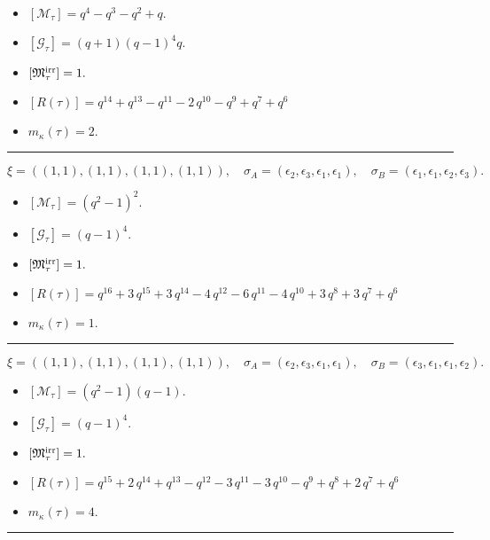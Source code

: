 \documentclass[10pt,a4paper]{amsart}
\begin{document}
\begin{itemize}
 \item $[\mathcal{M}_{\tau}] = q^{4} - q^{3} - q^{2} + q .$

 \item $[\mathcal{G}_{\tau}] = {\left(q + 1\right)} {\left(q - 1\right)}^{4} q .$

 \item $[{\frak M}_{\tau}^{\textrm{irr}}] = 1 .$

 \item $[R(\tau)] = q^{14} + q^{13} - q^{11} - 2 \, q^{10} - q^{9} + q^{7} + q^{6} $

 \item $m_{\kappa}(\tau) = 2 .$

 \end{itemize}
\noindent\rule{8cm}{0.4pt}

$$\xi = ({(1, 1), (1, 1)}, {(1, 1), (1, 1)}),\quad \sigma_A = ({{\epsilon_2}, {\epsilon_3}}, {{\epsilon_1}, {\epsilon_1}}),\quad \sigma_B = ({{\epsilon_1}, {\epsilon_1}}, {{\epsilon_2}, {\epsilon_3}}).$$

\begin{itemize}
 \item $[\mathcal{M}_{\tau}] = {\left(q^{2} - 1\right)}^{2} .$

 \item $[\mathcal{G}_{\tau}] = {\left(q - 1\right)}^{4} .$

 \item $[{\frak M}_{\tau}^{\textrm{irr}}] = 1 .$

 \item $[R(\tau)] = q^{16} + 3 \, q^{15} + 3 \, q^{14} - 4 \, q^{12} - 6 \, q^{11} - 4 \, q^{10} + 3 \, q^{8} + 3 \, q^{7} + q^{6} $

 \item $m_{\kappa}(\tau) = 1 .$

 \end{itemize}
\noindent\rule{8cm}{0.4pt}

$$\xi = ({(1, 1), (1, 1)}, {(1, 1), (1, 1)}),\quad \sigma_A = ({{\epsilon_2}, {\epsilon_3}}, {{\epsilon_1}, {\epsilon_1}}),\quad \sigma_B = ({{\epsilon_3}, {\epsilon_1}}, {{\epsilon_1}, {\epsilon_2}}).$$

\begin{itemize}
 \item $[\mathcal{M}_{\tau}] = {\left(q^{2} - 1\right)} {\left(q - 1\right)} .$

 \item $[\mathcal{G}_{\tau}] = {\left(q - 1\right)}^{4} .$

 \item $[{\frak M}_{\tau}^{\textrm{irr}}] = 1 .$

 \item $[R(\tau)] = q^{15} + 2 \, q^{14} + q^{13} - q^{12} - 3 \, q^{11} - 3 \, q^{10} - q^{9} + q^{8} + 2 \, q^{7} + q^{6} $

 \item $m_{\kappa}(\tau) = 4 .$

 \end{itemize}
\noindent\rule{8cm}{0.4pt}
\end{document}
